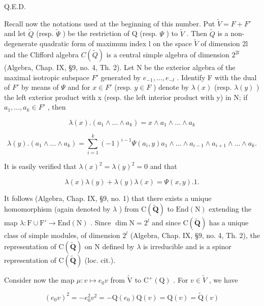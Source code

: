 Q.E.D.

Recall now the notations used at the beginning of this number. Put \(\tilde{V} = F + F'\) and let \(\tilde{Q}\) (resp. \(\tilde{\Psi}\) ) be the restriction of Q (resp. \(\Psi\) ) to \(\tilde{V}\) . Then \(\tilde{Q}\) is a non-degenerate quadratic form of maximum index l on the space \(\tilde{V}\) of dimension 2l and the Clifford algebra \(C(\tilde{Q})\) is a central simple algebra of dimension \(2^{2l}\) (Algebra, Chap. IX, §9, no. 4, Th. 2). Let N be the exterior algebra of the maximal isotropic subspace \(F'\) generated by \(e_{-1}, \ldots, e_{-l}\) . Identify F with the dual of \(F'\) by means of \(\Psi\) and for \(x \in F'\) (resp. \(y \in F\) ) denote by \(\lambda(x)\) (resp. \(\lambda(y)\) ) the left exterior product with x (resp. the left interior product with y) in N; if \(a_{1}, \ldots, a_{k} \in F'\) , then

\[
\lambda (x). (a _ {1} \wedge \dots \wedge a _ {k}) = x \wedge a _ {1} \wedge \dots \wedge a _ {k}
\]

\[
\lambda (y). \left(a _ {1} \wedge \dots \wedge a _ {k}\right) = \sum_ {i = 1} ^ {k} (- 1) ^ {i - 1} \Psi \left(a _ {i}, y\right) a _ {1} \wedge \dots \wedge a _ {i - 1} \wedge a _ {i + 1} \wedge \dots \wedge a _ {k}.
\]

It is easily verified that \(\lambda (x)^{2} = \lambda (y)^{2} = 0\) and that

\[
\lambda (x) \lambda (y) + \lambda (y) \lambda (x) = \Psi (x, y). 1.
\]

It follows (Algebra, Chap. IX, §9, no. 1) that there exists a unique homomorphism (again denoted by \(\lambda\) ) from \(\mathrm{C}(\tilde{\mathbf{Q}})\) to \(\mathrm{End}(\mathrm{N})\) extending the map \(\lambda : \mathrm{F} \cup \mathrm{F}' \to \mathrm{End}(\mathrm{N})\) . Since \(\dim \mathrm{N} = 2^l\) and since \(\mathrm{C}(\tilde{\mathbf{Q}})\) has a unique class of simple modules, of dimension \(2^l\) (Algebra, Chap. IX, §9, no. 4, Th. 2), the representation of \(\mathrm{C}(\tilde{\mathbf{Q}})\) on \(\mathrm{N}\) defined by \(\lambda\) is irreducible and is a spinor representation of \(\mathrm{C}(\tilde{\mathbf{Q}})\) (loc. cit.).

Consider now the map \(\mu:v\mapsto e_{0}v\) from \(\tilde{\mathrm{V}}\) to \(\mathrm{C}^{+}(\mathrm{Q})\) . For \(v\in\tilde{V}\) , we have

\[
(e _ {0} v) ^ {2} = - e _ {0} ^ {2} v ^ {2} = - \mathrm{Q} (e _ {0}) \mathrm{Q} (v) = \mathrm{Q} (v) = \tilde {\mathrm{Q}} (v)
\]

